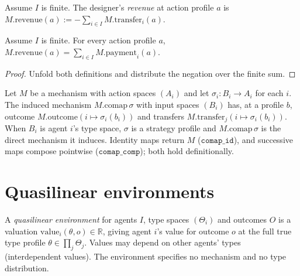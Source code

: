 \begin{definition}\label{def:MathEconLib.Mechanism.revenue}\leanok
{}
Assume $I$ is finite. The designer's \emph{revenue} at action profile $a$ is $M.\mathrm{revenue}(a):=-\sum_{i\in I}M.\mathrm{transfer}_i(a)$.
\end{definition}

\begin{lemma}\label{thm:MathEconLib.Mechanism.revenue_eq_sum_payment}\leanok
{}
Assume $I$ is finite. For every action profile $a$, $M.\mathrm{revenue}(a)=\sum_{i\in I}M.\mathrm{payment}_i(a)$.
\end{lemma}
\begin{proof}\leanok
{}
Unfold both definitions and distribute the negation over the finite sum.
\end{proof}

\begin{definition}\label{def:MathEconLib.Mechanism.comap}\leanok
{}
Let $M$ be a mechanism with action spaces $(A_i)$ and let $\sigma_i:B_i\to A_i$ for each $i$. The induced mechanism $M.\mathrm{comap}\,\sigma$ with input spaces $(B_i)$ has, at a profile $b$, outcome $M.\mathrm{outcome}(i\mapsto\sigma_i(b_i))$ and transfers $M.\mathrm{transfer}_j(i\mapsto\sigma_i(b_i))$. When $B_i$ is agent $i$'s type space, $\sigma$ is a strategy profile and $M.\mathrm{comap}\,\sigma$ is the direct mechanism it induces. Identity maps return $M$ ($\texttt{comap\_id}$), and successive maps compose pointwise ($\texttt{comap\_comp}$); both hold definitionally.
\end{definition}

\section{Quasilinear environments}

\begin{definition}\label{def:MathEconLib.Mechanism.QuasilinearEnvironment}\leanok
A \emph{quasilinear environment} for agents $I$, type spaces $(\Theta_i)$ and outcomes $O$ is a valuation $\mathrm{value}_i(\theta,o)\in\mathbb{R}$, giving agent $i$'s value for outcome $o$ at the full true type profile $\theta\in\prod_j\Theta_j$. Values may depend on other agents' types (interdependent values). The environment specifies no mechanism and no type distribution.
\end{definition}

